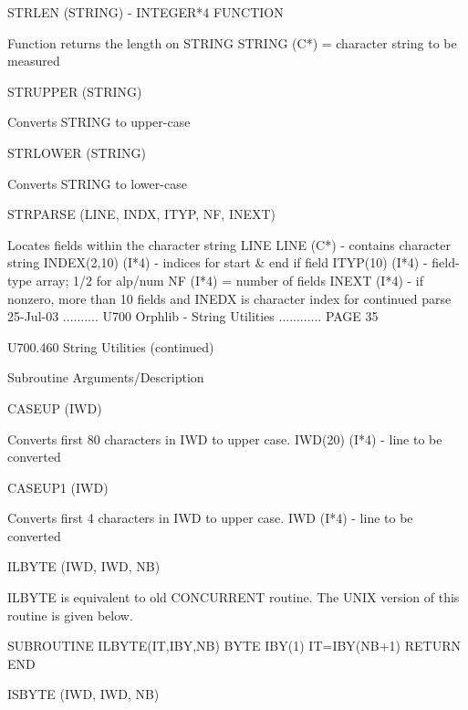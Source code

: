    STRLEN             (STRING)  -  INTEGER*4 FUNCTION
 
                       Function returns the length on STRING
                       STRING (C*) = character string to be measured
 
   STRUPPER           (STRING)
 
                       Converts STRING to upper-case
 
   STRLOWER           (STRING)
 
                       Converts STRING to lower-case
 
   STRPARSE           (LINE, INDX, ITYP, NF, INEXT)
 
                       Locates fields within the character string LINE
                       LINE        (C*)  - contains character string
                       INDEX(2,10) (I*4) - indices for start & end if field
                       ITYP(10)    (I*4) - field-type array;  1/2 for alp/num
                       NF          (I*4) = number of fields
                       INEXT       (I*4) - if nonzero, more than 10 fields
                                           and INEDX is character index for
                                           continued parse
    
   25-Jul-03 .......... U700  Orphlib - String Utilities ............ PAGE  35
 
 
   U700.460  String Utilities (continued)
 
   Subroutine          Arguments/Description
 
   CASEUP             (IWD)
 
                       Converts first 80 characters in IWD to upper case.
                       IWD(20) (I*4) - line to be converted
 
   CASEUP1            (IWD)
 
                       Converts first 4 characters in IWD to upper case.
                       IWD (I*4) - line to be converted
 
   ILBYTE             (IWD, IWD, NB)
 
                       ILBYTE is equivalent to old CONCURRENT routine.
                       The UNIX version of this routine is given below.
 
                       SUBROUTINE ILBYTE(IT,IBY,NB)
                       BYTE IBY(1)
                       IT=IBY(NB+1)
                       RETURN
                       END
 
   ISBYTE             (IWD, IWD, NB)
 
